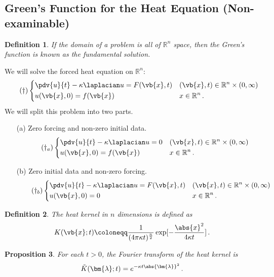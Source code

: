 \documentclass{article}
\theoremstyle{plain}\theoremheaderfont{\normalfont\itshape}\theorembodyfont{\rmfamily}\theoremseparator{.}\newtheorem*{rem}{Remark}\newtheorem*{ex}{Example}\newtheorem*{proof}{Proof}\newtheorem*{altp}{Alternative proof}
\theoremstyle{plain}\theoremheaderfont{\normalfont\bfseries}\theorembodyfont{\rmfamily}\theoremseparator{.}\newtheorem{thm}{Theorem}[section]\newtheorem{lem}[thm]{Lemma}\newtheorem{prop}[thm]{Proposition}\newtheorem*{cor}{Corollary}\newtheorem{defn}[thm]{Definition}\newtheorem{clm}[thm]{Claim}\newtheorem{clminproof}{Claim}
\theoremstyle{break}\theoremheaderfont{\normalfont\itshape}\theorembodyfont{\rmfamily}\theoremseparator{.\medskip}\newtheorem*{proofskip}{Proof}\newtheorem*{exs}{Examples}\newtheorem*{rems}{Remarks}
\theoremstyle{break}\theoremheaderfont{\normalfont\bfseries}\theorembodyfont{\rmfamily}\theoremseparator{.\medskip}\newtheorem{lemskip}[thm]{Lemma}\newtheorem{defnskip}[thm]{Definition}\newtheorem{propskip}[thm]{Proposition}\newtheorem{thmskip}[thm]{Theorem}
\numberwithin{equation}{section}
\newcommand{\bl}{\bm{\lambda}}
\begin{document}
	\subsection{Green's Function for the Heat Equation (Non-examinable)}
	\begin{defn}
		If the domain of a problem is all of \(\mathbb{R}^n\) space, then the Green's function is known as the \textit{fundamental solution}.
	\end{defn}
	We will solve the forced heat equation on \(\mathbb{R}^n\):
	\begin{equation}\tag{\(\dagger\)}
		\left\{\begin{aligned}
			&\pdv{u}{t}-\kappa\laplacian u=F(\vb{x},t) && (\vb{x},t)\in\mathbb{R}^n\times(0,\infty)\\
			&u(\vb{x},0)=f(\vb{x}) && x\in\mathbb{R}^n\,.
		\end{aligned}\right.
	\end{equation}
	We will split this problem into two parts.
	\begin{itemize}[topsep=0pt]
		\item[(a)] Zero forcing and non-zero initial data.
		\begin{equation}\tag{\(\dagger_a\)}
			\left\{\begin{aligned}
				&\pdv{u}{t}-\kappa\laplacian u=0 && (\vb{x},t)\in\mathbb{R}^n\times(0,\infty)\\
				&u(\vb{x},0)=f(\vb{x}) && x\in\mathbb{R}^n\,.
			\end{aligned}\right.
		\end{equation}
		\item[(b)] Zero initial data and non-zero forcing.
		\begin{equation}\tag{\(\dagger_b\)}
			\left\{\begin{aligned}
				&\pdv{u}{t}-\kappa\laplacian u=F(\vb{x},t) && (\vb{x},t)\in\mathbb{R}^n\times(0,\infty)\\
				&u(\vb{x},0)=0 && x\in\mathbb{R}^n\,.
			\end{aligned}\right.
		\end{equation}
	\end{itemize}
	\begin{defn}
		The \textit{heat kernel} in \(n\) dimensions is defined as
		\[K(\vb{x};t)\coloneqq\frac{1}{(4\pi\kappa t)^\frac{n}{2}}\exp[-\frac{\abs{x}^2}{4\kappa t}]\,.\]
	\end{defn}
	\begin{prop}
		For each \(t>0\), the Fourier transform of the heat kernel is
		\[\tilde{K}(\bl;t)=e^{-\kappa t\abs{\bl}^2}\,.\]
	\end{prop}
\end{document}
